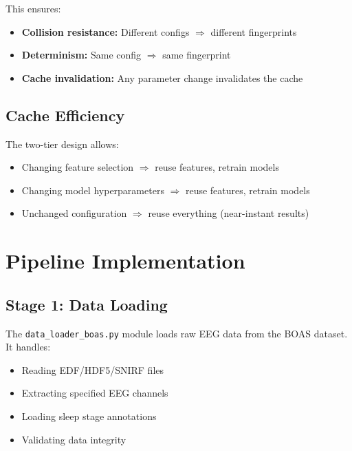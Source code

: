 This ensures:
\begin{itemize}
    \item \textbf{Collision resistance:} Different configs $\Rightarrow$ different fingerprints
    \item \textbf{Determinism:} Same config $\Rightarrow$ same fingerprint
    \item \textbf{Cache invalidation:} Any parameter change invalidates the cache
\end{itemize}

\subsection{Cache Efficiency}
\label{subsec:cache_efficiency}


The two-tier design allows:
\begin{itemize}
    \item Changing feature selection $\Rightarrow$ reuse features, retrain models
    \item Changing model hyperparameters $\Rightarrow$ reuse features, retrain models
    \item Unchanged configuration $\Rightarrow$ reuse everything (near-instant results)
\end{itemize}

\section{Pipeline Implementation}
\label{sec:pipeline_impl}

\subsection{Stage 1: Data Loading}
\label{subsec:data_loading}

The \texttt{data\_loader\_boas.py} module loads raw EEG data from the BOAS dataset. It handles:

\begin{itemize}
    \item Reading EDF/HDF5/SNIRF files
    \item Extracting specified EEG channels
    \item Loading sleep stage annotations
    \item Validating data integrity
\end{itemize}


